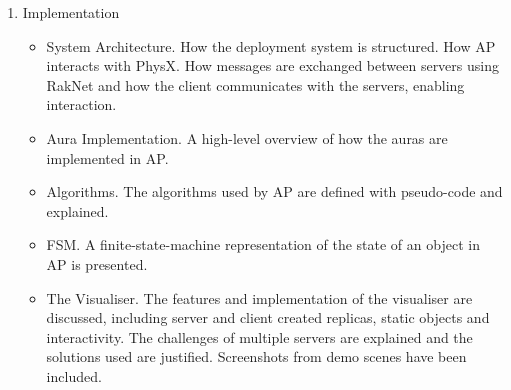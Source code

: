 \begin{enumerate}
\item Implementation
\begin{itemize}
	\item System Architecture. How the deployment system is structured. How AP interacts with PhysX. How messages are exchanged between servers using RakNet and how the client communicates with the servers, enabling interaction.
	\item Aura Implementation. A high-level overview of how the auras are implemented in AP.
	\item Algorithms. The algorithms used by AP are defined with pseudo-code and explained.
	\item FSM. A finite-state-machine representation of the state of an object in AP is presented.
	\item The Visualiser. The features and implementation of the visualiser are discussed, including server and client created replicas, static objects and interactivity. The challenges of multiple servers are explained and the solutions used are justified. Screenshots from demo scenes have been included.
\end{itemize}


\end{enumerate}
